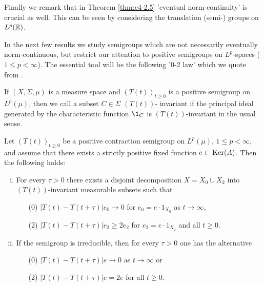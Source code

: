 Finally we remark that in Theorem \ref{thm:c4-2.5} 'eventual norm-continuity' is crucial as well.
This can be seen by considering the translation (semi-) groups on $L^{p}(\mathbb{R})$.

In the next few results we study semigroups which are not necessarily eventually norm-continuous, but restrict our attention to positive semigroups on $L^{p}$-spaces ($1 \leq p < \infty$).
The essential tool will be the following '0-2 law' which we quote from \citet[Theorem 3.7]{greiner:1982}.

If $(X, \Sigma, \mu)$ is a measure space and $(T(t))_{t \geq 0}$ is a positive semigroup on $L^{p}(\mu)$, then we call a subset $C \in \Sigma$ $(T(t))$- invariant if the principal ideal generated by the characteristic function $\1_{C}$ is $(T(t))$-invariant in the usual sense.

\begin{theorem}\label{thm:c4-2.6}
Let $(T(t))_{t \geq 0}$ be a positive contraction semigroup on $L^{p}(\mu)$, $1 \leq p < \infty$, and assume that there exists a strictly positive fixed function $e \in \mathop{}\mathrm{Ker}(A)$. 
Then the following holds:

\begin{enumerate}[(i)]
\item \label{thm:c4-2.6-1}
For every $\tau > 0$ there exists a disjoint decomposition $X = X_{0} \cup X_{2}$ into $(T(t))$-invariant measurable subsets such that

\begin{enumerate}%
\item[(0)] \label{thm:c4-2.6-1.1} 
$|T(t) - T(t+\tau)|e_{0} \to 0$ for $e_{0} = e \cdot 1_{X_{0}}$ as $t \to \infty$,
\item[(2)] \label{thm:c4-2.6-1.2} 
$|T(t) - T(t+\tau)|e_{2} \geq 2e_{2}$ for $e_{2} = e \cdot 1_{X_{2}}$ and all $t \geq 0$.
\end{enumerate}
\item \label{thm:c4-2.6-2} 
If the semigroup is irreducible, then for every $\tau > 0$ one has the alternative
\begin{enumerate}
\item[(0)] \label{thm:c4-2.6-2.1} 
$|T(t) - T(t+\tau)|e \to 0$ as $t \to \infty$ or
\item[(2)] \label{thm:c4-2.6-2.2} 
$|T(t) - T(t+\tau)|e = 2e$ for all $t \geq 0$.
\end{enumerate}
\end{enumerate}
\end{theorem}

